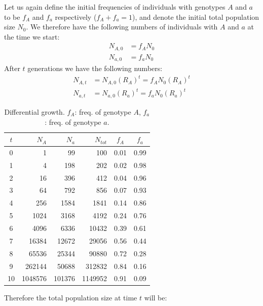 \documentclass[11pt,a4paper]{book}
\begin{document}
Let us again define the initial frequencies of individuals with genotypes $A$ and $a$ to be  $f_A$ and $f_a$ respectively ($f_A+f_a=1$), and denote the initial total population size $N_0$. We therefore have the following numbers of individuals with $A$ and $a$ at the time we start:
%
\begin{align*}
N_{A,0} &= f_A N_0\\
N_{a,0} &= f_a N_0
\end{align*}
%
After $t$ generations we have the following numbers:
%
\begin{align*}
N_{A,t} &= N_{A,0}(R_A)^t = f_A N_0 (R_A)^t\\
N_{a,t} &= N_{a,0}(R_a)^t = f_a N_0 (R_a)^t
\end{align*}
%
\begin{table}[!t]
\footnotesize
\caption{\small Differential growth. $f_A$: freq. of genotype $A$, $f_a$: freq. of genotype $a$.}
\begin{center}
\begin{tabular*}{\textwidth}{@{\extracolsep{\fill}}crrrcc}
\hline 
$t$ 	& $N_A$ &  $N_a$ & $N_{tot}$ & $f_A$  & $f_a$\\
\hline 
0 &	1		&	99		& 	100 		&	0.01	&	0.99\\
1 &	4		&	198		& 	202 		&	0.02	&	0.98\\
2 &	16		&	396		&	412 		&	0.04	&	0.96\\
3 &	64		&	792		&	856 		&	0.07	&	0.93\\
4 &	256		&	1584		&	1841		&	0.14	&	0.86\\
5 &	1024		&	3168		&	4192		&	0.24	&	0.76\\
6 &	4096		&	6336		&	10432	&	0.39	&	0.61\\
7 &	16384	&	12672	&	29056	&	0.56	&	0.44\\
8 &   65536	&	25344	&	90880	&	0.72	&	0.28\\
9 &   262144	&	50688	&	312832	&	0.84	&	0.16\\
10 &	1048576	&	101376	&	1149952	&	0.91	&	0.09\\
\hline 
\end{tabular*}
\end{center}
\label{TABnatsel}
\end{table}%
%
Therefore the total population size at time $t$ will be:
\end{document}
